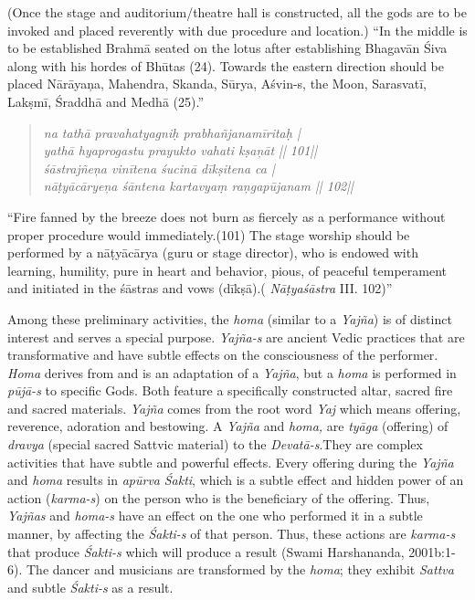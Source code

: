 (Once the stage and auditorium/theatre hall is constructed, all the gods are to be invoked and placed reverently with due procedure and location.) “In the middle is to be established Brahmā seated on the lotus after establishing Bhagavān Śiva along with his hordes of Bhūtas (24). Towards the eastern direction should be placed Nārāyaņa, Mahendra, Skanda, Sūrya, Aśvin-s, the Moon, Sarasvatī, Lakṣmī, Śraddhā and Medhā (25).”

\begin{verse}
\textit{na tathā pravahatyagniḥ prabhañjanamīritaḥ |}\\\textit{yathā hyaprogastu prayukto vahati kṣaņāt || 101||}\\\textit{śāstrajñeņa vinītena śucinā dīkṣitena ca | }\\\textit{nāṭyācāryeņa śāntena kartavyaṃ raņgapūjanam || 102||}
\end{verse}

“Fire fanned by the breeze does not burn as fiercely as a performance without proper procedure would immediately.(101) The stage worship should be performed by a nāṭyācārya (guru or stage director), who is endowed with learning, humility, pure in heart and behavior, pious, of peaceful temperament and initiated in the śāstras and vows (dīkṣā).( \textit{Nāṭyaśāstra} III. 102)” 

 Among these preliminary activities, the \textit{homa} (similar to a \textit{Yajña}) is of distinct interest and serves a special purpose. \textit{Yajña-s} are ancient Vedic practices that are transformative and have subtle effects on the consciousness of the performer. \textit{Homa} derives from and is an adaptation of a \textit{Yajña}, but a \textit{homa} is performed in \textit{pūjā-s }to specific Gods. Both feature a specifically constructed altar, sacred fire and sacred materials. \textit{Yajña} comes from the root word \textit{Yaj} which means offering, reverence, adoration and bestowing. A \textit{Yajña} and \textit{homa,} are \textit{tyāga }(offering) of \textit{dravya} (special sacred Sattvic material) to the \textit{Devatā-s}.\break They are complex activities that have subtle and powerful effects. Every offering during the \textit{Yajña} and \textit{homa} results in \textit{apūrva} \textit{Śakti}, which is a subtle effect and hidden power of an action (\textit{karma-s}) on the person who is the beneficiary of the offering. Thus, \textit{Yajñas} and \textit{homa-s} have an effect on the one who performed it in a subtle manner, by affecting the \textit{Śakti-s }of that person. Thus, these actions are \textit{karma-s} that produce \textit{Śakti-s} which will produce a result (Swami Harshananda, 2001b:1-6). The dancer and musicians are transformed by the \textit{homa}; they exhibit \textit{Sattva} and subtle \textit{Śakti-s} as a result.

